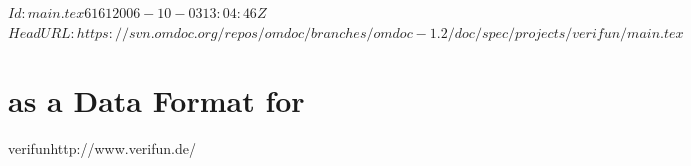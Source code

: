 \svnInfo $Id: main.tex 6161 2006-10-03 13:04:46Z  $
\svnKeyword $HeadURL: https://svn.omdoc.org/repos/omdoc/branches/omdoc-1.2/doc/spec/projects/verifun/main.tex $

\section[VeriFun]{{\omdoc} as a Data Format for {\verifun}}

\begin{project}{verifun}{http://www.verifun.de/}
\end{project}

